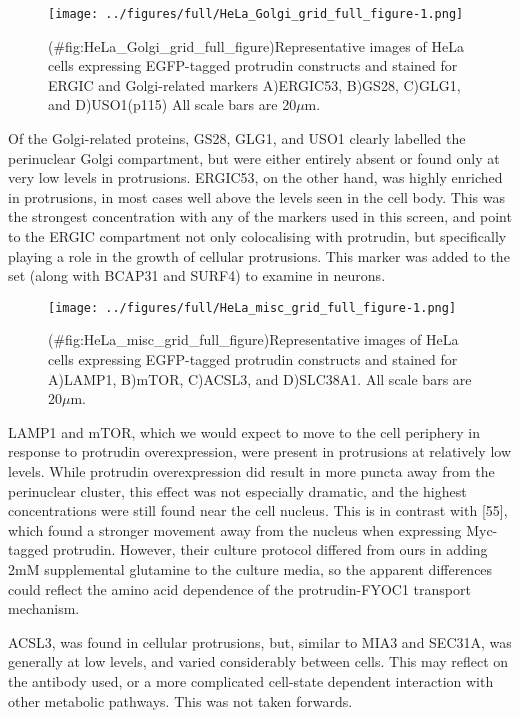 \documentclass[
  12pt,
  a4paper,
]{book}
\begin{document}
\begin{figure}
\centering
\texttt{[image: ../figures/full/HeLa\_Golgi\_grid\_full\_figure-1.png]}
\caption{(\#fig:HeLa\_Golgi\_grid\_full\_figure)Representative images of HeLa cells expressing EGFP-tagged protrudin constructs and stained for ERGIC and Golgi-related markers A)ERGIC53, B)GS28, C)GLG1, and D)USO1(p115) All scale bars are 20\(\mu\)m.}
\end{figure}

Of the Golgi-related proteins, GS28, GLG1, and USO1 clearly labelled the perinuclear Golgi compartment, but were either entirely absent or found only at very low levels in protrusions. ERGIC53, on the other hand, was highly enriched in protrusions, in most cases well above the levels seen in the cell body. This was the strongest concentration with any of the markers used in this screen, and point to the ERGIC compartment not only colocalising with protrudin, but specifically playing a role in the growth of cellular protrusions. This marker was added to the set (along with BCAP31 and SURF4) to examine in neurons.

\begin{figure}
\centering
\texttt{[image: ../figures/full/HeLa\_misc\_grid\_full\_figure-1.png]}
\caption{(\#fig:HeLa\_misc\_grid\_full\_figure)Representative images of HeLa cells expressing EGFP-tagged protrudin constructs and stained for A)LAMP1, B)mTOR, C)ACSL3, and D)SLC38A1. All scale bars are 20\(\mu\)m.}
\end{figure}

LAMP1 and mTOR, which we would expect to move to the cell periphery in response to protrudin overexpression, were present in protrusions at relatively low levels. While protrudin overexpression did result in more puncta away from the perinuclear cluster, this effect was not especially dramatic, and the highest concentrations were still found near the cell nucleus. This is in contrast with {[}55{]}, which found a stronger movement away from the nucleus when expressing Myc-tagged protrudin. However, their culture protocol differed from ours in adding 2mM supplemental glutamine to the culture media, so the apparent differences could reflect the amino acid dependence of the protrudin-FYOC1 transport mechanism.

ACSL3, was found in cellular protrusions, but, similar to MIA3 and SEC31A, was generally at low levels, and varied considerably between cells. This may reflect on the antibody used, or a more complicated cell-state dependent interaction with other metabolic pathways. This was not taken forwards.
\end{document}
